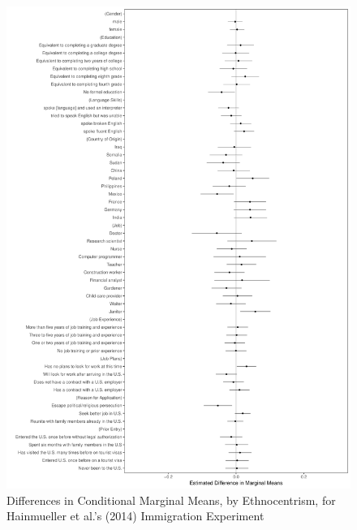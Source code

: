 \documentclass[a4paper,12pt]{article}\usepackage[]{graphicx}\usepackage[]{color}
\makeatletter
\def\maxwidth{ %
  \ifdim\Gin@nat@width>\linewidth
    \linewidth
  \else
    \Gin@nat@width
  \fi
}
\newenvironment{knitrout}{}{} %
\makeatother
\begin{document}
\begin{knitrout}
\color{fgcolor}\begin{figure}
\includegraphics[width=\maxwidth]{figure/hainmueller_mm_diffs-1} \caption[Differences in Conditional Marginal Means, by Ethnocentrism, for Hainmueller et al.'s (2014) Immigration Experiment]{Differences in Conditional Marginal Means, by Ethnocentrism, for Hainmueller et al.'s (2014) Immigration Experiment}\label{fig:hainmueller_mm_diffs}
\end{figure}


\end{knitrout}
\end{document}
